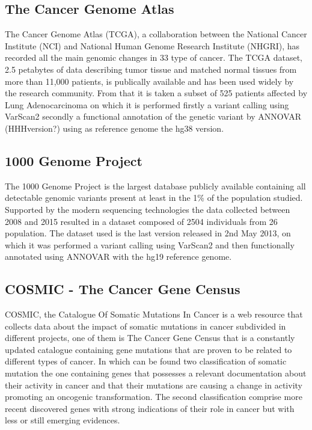 \subsection{The Cancer Genome Atlas}
The Cancer Genome Atlas (TCGA), a collaboration between the National Cancer Institute (NCI) and National Human Genome Research Institute (NHGRI), has recorded all the main genomic changes in 33 type of cancer. The TCGA dataset, 2.5 petabytes of data describing tumor tissue and matched normal tissues from more than 11,000 patients, is publically available and has been used widely by the research community. From that it is taken a subset of 525 patients affected by Lung Adenocarcinoma on which it is performed firstly a variant calling using VarScan2 secondly a functional annotation of the genetic variant by ANNOVAR (HHHversion?) using as reference genome the hg38 version.

\subsection{1000 Genome Project}
The 1000 Genome Project is the largest database publicly available containing all detectable genomic variants present at least in the 1\% of the population studied. Supported by the modern sequencing technologies the data collected between 2008 and 2015 resulted in a dataset composed of 2504 individuals from 26 population. The dataset used is the last version released in 2nd May 2013, on which it was performed a variant calling using VarScan2 and then functionally annotated using ANNOVAR with the hg19 reference genome.

\subsection{COSMIC - The Cancer Gene Census}
COSMIC, the Catalogue Of Somatic Mutations In Cancer is a web resource that collects data about the impact of somatic mutations in cancer subdivided in different projects, one of them is The Cancer Gene Census that is a constantly updated catalogue containing gene mutations that are proven to be related to different types of cancer. In which can be found two classification of somatic mutation the one containing genes that possesses a relevant documentation about their activity in cancer and that their mutations are causing a change in activity promoting an oncogenic transformation. The second classification comprise more recent discovered genes with strong indications of their role in cancer but with less or still emerging evidences.

